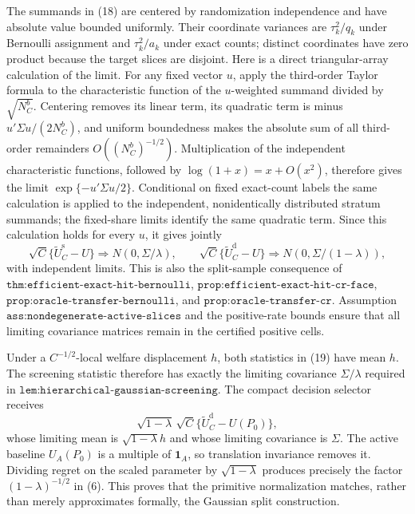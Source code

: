 The summands in (18) are centered by randomization independence and have absolute value bounded uniformly.  Their coordinate variances are \(\tau_k^2/q_k\) under Bernoulli assignment and \(\tau_k^2/a_k\) under exact counts; distinct coordinates have zero product because the target slices are disjoint.  Here is a direct triangular-array calculation of the limit.  For any fixed vector \(u\), apply the third-order Taylor formula to the characteristic function of the \(u\)-weighted summand divided by \(\sqrt{N_C^b}\).  Centering removes its linear term, its quadratic term is minus \(u'\Sigma u/(2N_C^b)\), and uniform boundedness makes the absolute sum of all third-order remainders \(O((N_C^b)^{-1/2})\).  Multiplication of the independent characteristic functions, followed by \(\log(1+x)=x+O(x^2)\), therefore gives the limit \(\exp\{-u'\Sigma u/2\}\).  Conditional on fixed exact-count labels the same calculation is applied to the independent, nonidentically distributed stratum summands; the fixed-share limits identify the same quadratic term.  Since this calculation holds for every \(u\), it gives jointly
\[
 \sqrt C\{\widetilde U_C^{\mathrm s}-U\}
 \Rightarrow N(0,\Sigma/\lambda),
 \qquad
 \sqrt C\{\widetilde U_C^{\mathrm d}-U\}
 \Rightarrow N(0,\Sigma/(1-\lambda)),
\tag{19}
\]
with independent limits.  This is also the split-sample consequence of \(\texttt{thm:efficient-exact-hit-bernoulli}\), \(\texttt{prop:efficient-exact-hit-cr-face}\), \(\texttt{prop:oracle-transfer-bernoulli}\), and \(\texttt{prop:oracle-transfer-cr}\).  Assumption \(\texttt{ass:nondegenerate-active-slices}\) and the positive-rate bounds ensure that all limiting covariance matrices remain in the certified positive cells.

Under a \(C^{-1/2}\)-local welfare displacement \(h\), both statistics in (19) have mean \(h\).  The screening statistic therefore has exactly the limiting covariance \(\Sigma/\lambda\) required in \(\texttt{lem:hierarchical-gaussian-screening}\).  The compact decision selector receives
\[
 \sqrt{1-\lambda}\,\sqrt C
 \{\widetilde U_C^{\mathrm d}-U(P_0)\},
\tag{20}
\]
whose limiting mean is \(\sqrt{1-\lambda}h\) and whose limiting covariance is \(\Sigma\).  The active baseline \(U_A(P_0)\) is a multiple of \(\mathbf1_A\), so translation invariance removes it.  Dividing regret on the scaled parameter by \(\sqrt{1-\lambda}\) produces precisely the factor \((1-\lambda)^{-1/2}\) in (6).  This proves that the primitive normalization matches, rather than merely approximates formally, the Gaussian split construction.

